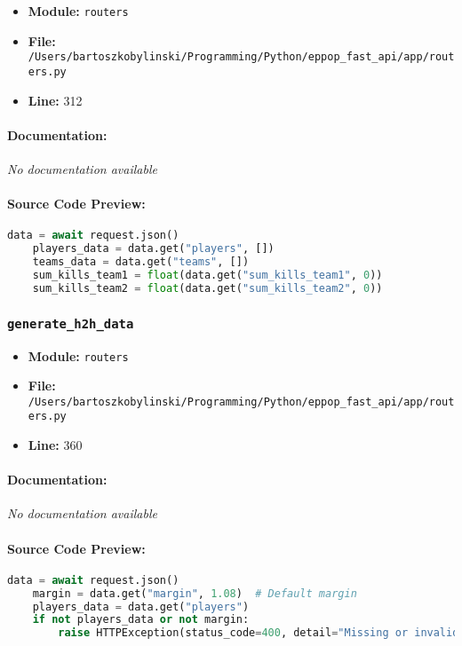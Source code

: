 \documentclass[11pt,a4paper]{article}
\begin{document}
\begin{itemize}
    \item \textbf{Module:} \texttt{routers}
    \item \textbf{File:} \texttt{/Users/bartoszkobylinski/Programming/Python/eppop\_fast\_api/app/routers.py}
    \item \textbf{Line:} 312
\end{itemize}

\paragraph{Documentation:} \textit{No documentation available}

\paragraph{Source Code Preview:}
\begin{lstlisting}[language=Python]
    data = await request.json()
    players_data = data.get("players", [])
    teams_data = data.get("teams", [])
    sum_kills_team1 = float(data.get("sum_kills_team1", 0))
    sum_kills_team2 = float(data.get("sum_kills_team2", 0))
\end{lstlisting}

\vspace{1em}
\subsubsection{\texttt{generate\_h2h\_data}}

\begin{itemize}
    \item \textbf{Module:} \texttt{routers}
    \item \textbf{File:} \texttt{/Users/bartoszkobylinski/Programming/Python/eppop\_fast\_api/app/routers.py}
    \item \textbf{Line:} 360
\end{itemize}

\paragraph{Documentation:} \textit{No documentation available}

\paragraph{Source Code Preview:}
\begin{lstlisting}[language=Python]
    data = await request.json()
    margin = data.get("margin", 1.08)  # Default margin
    players_data = data.get("players")
    if not players_data or not margin:
        raise HTTPException(status_code=400, detail="Missing or invalid data in the request")
\end{lstlisting}
\end{document}
